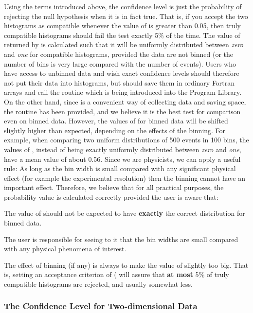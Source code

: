 Using the terms introduced above, the confidence level is just
the probability of rejecting the null hypothesis when it
is in fact true. That is, if you accept the two histograms
as compatible whenever the value of  is greater than 0.05,
then truly compatible histograms should fail the test
exactly 5\% of the time.
The value of  returned by  is calculated such that
it will be uniformly distributed between {\it zero} and {\it one}
for compatible histograms, provided the
data are not binned (or the number of bins is very large compared
with the number of events).
Users who have access to unbinned data and wish exact confidence
levels should therefore not put their data into histograms,
but should save them in ordinary Fortran arrays and call the
routine  which is being introduced into the Program Library.
On the other hand, since  is a convenient way of collecting
data and saving space, the routine  has been provided,
and we believe it is the best test for comparison even on binned
data. However, the values of  for binned data will be shifted
slightly higher than expected, depending on the effects of the
binning.
For example, when comparing two uniform distributions of 500
events in 100 bins, the values of , instead of being
exactly uniformly distributed between {\it zero} and {\it one},
have a mean value of about 0.56.
Since we are physicists, we can apply a useful rule:
As long as the bin width is small compared with any significant
physical effect (for example the experimental resolution)
then the binning cannot have an important effect.
Therefore,
we believe that for all practical purposes, the probability value
 is calculated correctly provided the user is aware that:
\begin{UL}
\item
The value of  should not be expected to have
{\bf exactly} the correct distribution for binned data.
\item
The user is responsible for seeing to it that the bin widths are
small compared with any physical phenomena of interest.
\item
The effect of binning (if any) is always to make the value of 
slightly too big. That is, setting an acceptance criterion of
( will assure that {\bf at most}
5\% of truly
compatible histograms are rejected, and usually somewhat less.
\end{UL}
 
\subsubsection*{The Confidence Level for Two-dimensional Data}
 
